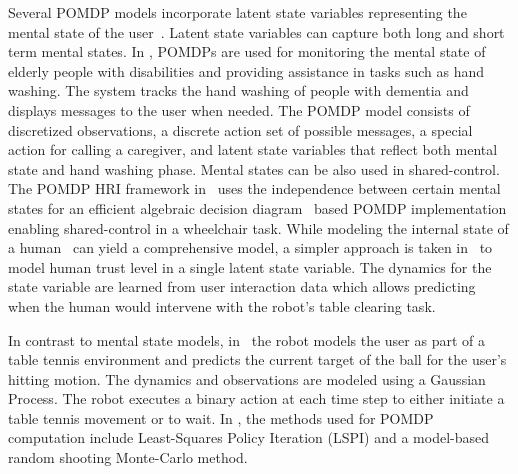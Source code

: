 \documentclass[journal]{IEEEtran}
\begin{document}
%
Several POMDP models incorporate latent state variables representing
the mental state of the
user~\cite{hoey2010automated,taha2011pomdp,chen2018planning}.
{Latent state variables can capture both long and short term
  mental states. In \cite{hoey2010automated}, POMDPs are used for
  monitoring the mental state of elderly people with disabilities and
  providing assistance in tasks such as hand washing. The system
  tracks the hand washing of people with dementia and displays
  messages to the user when needed. The POMDP model consists of
  discretized observations, a discrete action set of possible
  messages, a special action for calling a caregiver, and latent state
  variables that reflect both mental state and hand washing
  phase. Mental states can be also used in
  shared-control. The POMDP HRI framework in~\cite{taha2011pomdp} uses
  the independence between certain mental states for an efficient
  algebraic decision diagram~\cite{poupart2005exploiting} based
  POMDP implementation enabling shared-control in a wheelchair
  task. While modeling the internal state of a
  human~\cite{hoey2010automated,taha2011pomdp} can yield a
  comprehensive model, a simpler approach is taken in~\cite{chen2018planning} to model human
  trust level in a single latent state variable. The dynamics for the
  state variable are learned from user interaction data which allows
  predicting when the human would intervene with the robot's table
  clearing task.}

{In contrast to mental state models, in~\cite{wang2017anticipatory} the robot models the user as part of a table tennis environment and predicts the current target of the ball for the user's hitting motion.}
The dynamics
and observations are modeled using a Gaussian Process. The robot
executes a binary action at each time step to either initiate a table
tennis movement or to wait. In \cite{wang2017anticipatory}, the
methods {used} for POMDP computation include Least-Squares
Policy Iteration (LSPI) and a model-based random shooting Monte-Carlo
method.

%
%
%
%
%
%
%
%
%
%
%
%
%
%
%
%
%
%
%
%
%
%
%
%
%
%
%
%
%
%
%
%
%
%
%
%
\end{document}
